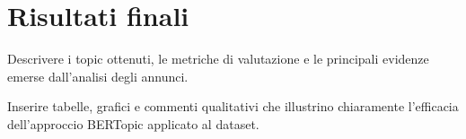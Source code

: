 \chapter{Risultati finali}
Descrivere i topic ottenuti, le metriche di valutazione e le principali evidenze emerse dall'analisi degli annunci.
\par
Inserire tabelle, grafici e commenti qualitativi che illustrino chiaramente l'efficacia dell'approccio BERTopic applicato al dataset.

